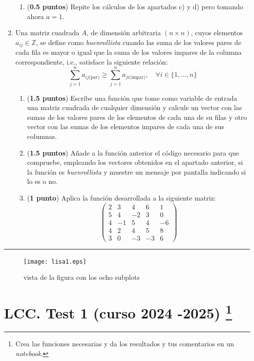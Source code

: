 \begin{enumerate}
\begin{enumerate}
\item (\textbf{0.5 puntos}) Repite los cálculos de los apartados c) y d) pero tomando ahora $a=1$.
\end{enumerate}

\item Una matriz cuadrada $A$, de dimensión arbitraria $(n\times n)$, cuyos elementos $a_{ij} \in \mathbb{Z}$, se define como \emph{buenrollista} cuando las suma de los valores pares de cada fila es mayor o igual que la suma de los valores  impares de la columna correspondiente, i.e., satisface la siguiente relación:
\begin{equation}
	\sum_{j=1}^n a_{ij\text{(par)}} \geq \sum_{j=1}^n a_{ji\text{(impar)}}, \quad \forall i\in\{1,...,n\}
\end{equation}

\begin{enumerate}
\item (\textbf{1.5 puntos}) Escribe  una función que tome como variable de entrada una matriz cuadrada de cualquier dimensión 
y calcule un vector con las sumas de los valores pares de los elementos de cada una de su filas  y otro vector con las sumas de los elementos impares de cada una de sus columnas.
\item (\textbf{1.5 puntos}) Añade a la función anterior el código necesario para que compruebe, empleando los vectores obtenidos en el apartado anterior, si la función es \emph{buenrollista} y muestre un mensaje por pantalla indicando si lo es o no.
\item (\textbf{1 punto}) Aplica la función desarrollada a la siguiente matriz:
\begin{equation*}
\begin{pmatrix}
2&3&4&6&1\\
5&4&-2&3&0\\
4&-1&5&4&-6\\
4&2&4&5&8\\
3&0&-3&-3&6
\end{pmatrix}
\end{equation*}
\end{enumerate}
\end{enumerate}
\noindent\rule{\textwidth}{0.4pt}
\begin{figure}[h]
\centering
\texttt{[image: lisa1.eps]}
\caption{vista de la figura con los ocho subplots} \label{fig:1}
\end{figure}
\newpage
\section{LCC. Test 1 (curso 2024 -2025) \protect\footnote{Crea las funciones necesarias  y da los resultados y tus comentarios en un \emph{notebook}. }}

